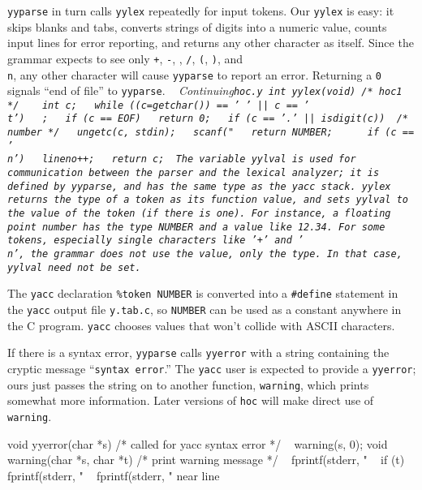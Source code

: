 {{\tt yyparse} in turn calls {\tt yylex} repeatedly for input
tokens. Our {\tt yylex} is easy: it skips blanks and tabs,
converts strings of digits into a numeric value, counts input
lines for error reporting, and returns any other character as
itself.
Since the grammar expects to see only {\tt+}, {\tt-}, {\tt*},
{\tt/}, {\tt(}, {\tt)}, and {\tt\\n}, any other character
will cause {\tt yyparse} to report an error. Returning a {\tt0}
signals ``end of file'' to {\tt yyparse}.
\begincode
~                       \it Continuing\/\tt hoc.y
int yylex(void)          /* hoc1 */
{
~       int c;
\smallskip
~       while ((c=getchar()) == ' ' || c == '\\t')
~               ;
~       if (c == EOF)
~               return 0;
~       if (c == '.' || isdigit(c)) {   /* number */
~               ungetc(c, stdin);
~               scanf("%
~               return NUMBER;
~       }
~       if (c == '\\n')
~               lineno++;
~       return c;
}
\endcode
\noindent
The variable {\tt yylval} is used for communication between
the parser and the lexical analyzer; it is defined by {\tt yyparse},
and has the same type as the {\tt yacc} stack. {\tt yylex} returns
the {\it type\/} of a token as its function value, and sets
{\tt yylval} to the {\it value\/} of the token (if there is one).
For instance, a floating point number has the type {\tt NUMBER}
and a value like 12.34. For some tokens, especially single
characters like {\tt'+'} and {\tt'\\n'}, the grammar does not use
the value, only the type. In that case, {\tt yylval} need not be set.

The {\tt yacc} declaration {\tt\%token NUMBER} is converted into
a {\tt\#define} statement in the {\tt yacc} output file {\tt y.tab.c},
so {\tt NUMBER} can be used as a constant anywhere in the C program.
{\tt yacc} chooses values that won't collide with {\sc ASCII} characters.

If there is a syntax error, {\tt yyparse} calls {\tt yyerror} with
a string containing the cryptic message ``{\tt syntax error}.''
The {\tt yacc} user is expected to provide a {\tt yyerror}; ours
just passes the string on to another function, {\tt warning},
which prints somewhat more information. Later versions of {\tt hoc}
will make direct use of {\tt warning}.

\begincode
void yyerror(char *s)  /* called for yacc syntax error */
{
~       warning(s, 0);
}
\medbreak
void warning(char *s, char *t)  /* print warning message */
{
~       fprintf(stderr, "%
~       if (t) fprintf(stderr, " %
~       fprintf(stderr, " near line %
}
\endcode

}
